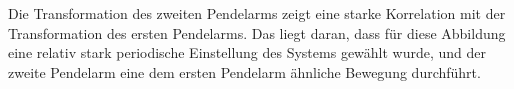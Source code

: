 Die Transformation des zweiten Pendelarms zeigt eine starke Korrelation mit der Transformation des ersten Pendelarms. Das liegt daran, dass für diese Abbildung eine relativ stark periodische Einstellung des Systems gewählt wurde, und der zweite Pendelarm eine dem ersten Pendelarm ähnliche Bewegung durchführt.

